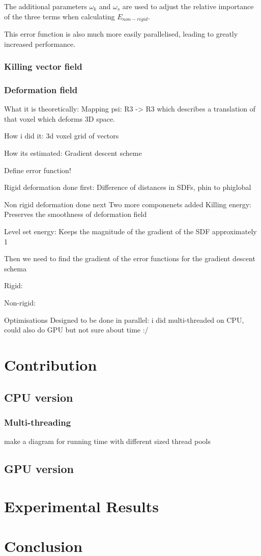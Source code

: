 \documentclass[12pt,twoside]{report}
\begin{document}
The additional parameters $\omega_k$ and $\omega_s$ are used to adjust the relative importance of the three terms when calculating $E_{non-rigid}$.

This error function is also much more easily parallelised, leading to greatly increased performance.\\


\subsection{Killing vector field}

\subsection{Deformation field}
What it is theoretically:
Mapping psi: R3 -> R3 which describes a translation of that voxel which deforms 3D space.

How i did it:
3d voxel grid of vectors

How its estimated:
Gradient descent scheme

Define error function!

Rigid deformation done first:
Difference of distances in SDFs, phin to phiglobal

Non rigid deformation done next
Two more componenets added
Killing energy:
Preserves the smoothness of deformation field

Level set energy:
Keeps the magnitude of the gradient of the SDF approximately 1

Then we need to find the gradient of the error functions for the gradient descent schema

Rigid:

Non-rigid:

Optimisations
Designed to be done in parallel: i did multi-threaded on CPU, could also do GPU but not sure about time :/


\chapter{Contribution}

\section{CPU version}

\subsection{Multi-threading}

make a diagram for running time with different sized thread pools

\section{GPU version}


\chapter{Experimental Results}


\chapter{Conclusion}



\end{document}

